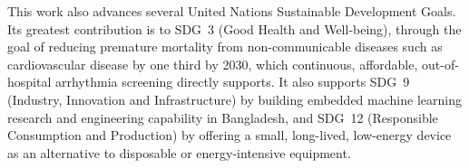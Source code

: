 This work also advances several United Nations Sustainable Development
Goals. Its greatest contribution is to SDG~3 (Good Health and Well-being),
through the goal of reducing premature mortality from non-communicable
diseases such as cardiovascular disease by one third by 2030, which
continuous, affordable, out-of-hospital arrhythmia screening directly
supports. It also supports SDG~9 (Industry, Innovation and Infrastructure)
by building embedded machine learning research and engineering capability
in Bangladesh, and SDG~12 (Responsible Consumption and Production) by
offering a small, long-lived, low-energy device as an alternative to
disposable or energy-intensive equipment.
